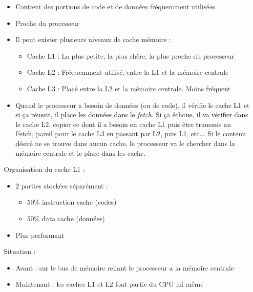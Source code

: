 \documentclass[a4paper]{article}
\begin{document}
    \begin{itemize}
      \item Contient des portions de code et de données fréquemment utilisées
      \item Proche du processeur
      \item Il peut exister plusieurs niveaux de cache mémoire :
      \begin{itemize}
        \item Cache L1 : La plus petite, la plus chère, la plus proche du processeur
        \item Cache L2 : Fréquemment utilisé, entre la L1 et la mémoire centrale
        \item Cache L3 : Placé entre la L2 et la mémoire centrale. Moins fréquent
      \end{itemize}
      \item Quand le processeur a besoin de données (ou de code), il vérifie le cache L1 et si ça réussit, il place les données dans le \emph{fetch}. 
      Si ça échoue, il va vérifier dans le cache L2, copier ce dont il a besoin en cache L1 puis être transmis au Fetch, pareil pour le cache L3 en passant par L2, puis L1, etc...
      Si le contenu désiré ne se trouve dans aucun cache, le processeur va le chercher dans la mémoire centrale et le place dans les cache.
    \end{itemize}
    Organisation du cache L1 :
    \begin{itemize}
      \item 2 parties stockées séparément :
      \begin{itemize}
        \item 50\% instruction cache (codes)
        \item 50\% data cache (données)
      \end{itemize}
      \item Plus performant
    \end{itemize}
    Situation :
    \begin{itemize}
      \item Avant : sur le bus de mémoire reliant le processeur a la mémoire centrale
      \item Maintenant : les caches L1 et L2 font partie du CPU lui-même
    \end{itemize}
    
\end{document}

